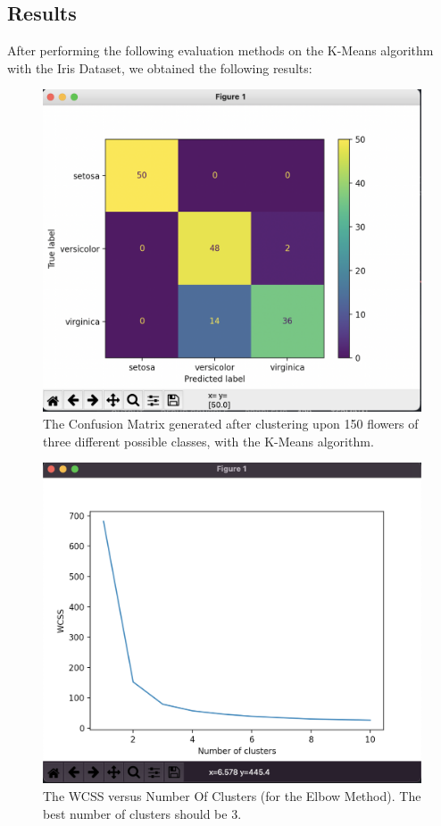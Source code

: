 \documentclass[10pt,twocolumn]{article}
\begin{document}
\subsection{Results}
After performing the following evaluation methods on the K-Means algorithm with the Iris Dataset, we obtained the following results:

\begin{figure}[h]
  \centering
  \includegraphics[scale=0.3]{confusion_matrix.png}
  \vspace{20px}
  \caption{The Confusion Matrix generated after clustering upon 150 flowers of three different possible classes, with the K-Means algorithm.}
  \label{confusion_matrix}
\end{figure}

\begin{figure}[H]
  \centering
  \includegraphics[scale=0.3]{iris_elbow.png}
  \vspace{20px}
  \caption{The WCSS versus Number Of Clusters (for the Elbow Method). The best number of clusters should be 3.}
  \label{iris_elbow}
\end{figure}
\end{document}
